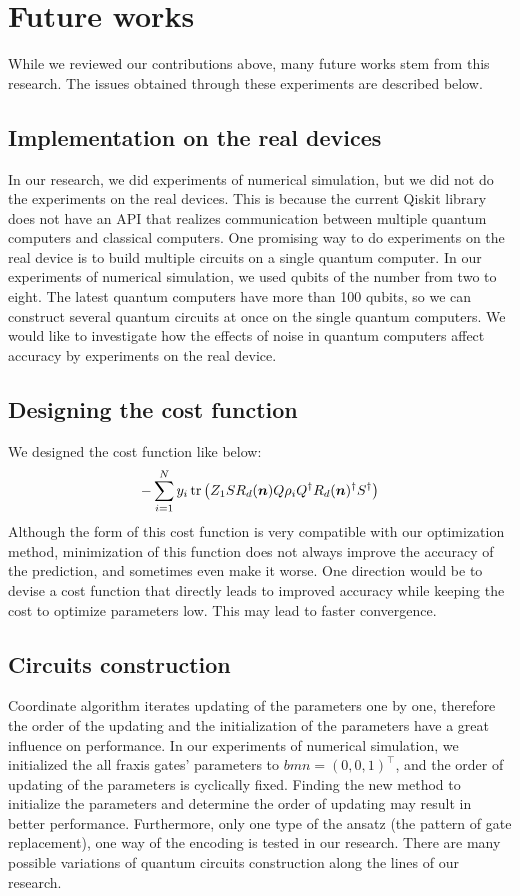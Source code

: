 \section{Future works}
While we reviewed our contributions above, many future works stem from this research. The issues obtained through these experiments are described below.

\subsection{Implementation on the real devices}
In our research, we did experiments of numerical simulation, but we did not do the experiments on the real devices. This is because the current Qiskit library does not have an API that realizes communication between multiple quantum computers and classical computers. One promising way to do experiments on the real device is to build multiple circuits on a single quantum computer. In our experiments of numerical simulation, we used qubits of the number from two to eight. The latest quantum computers have more than 100 qubits, so we can construct several quantum circuits at once on the single quantum computers. We would like to investigate how the effects of noise in quantum computers affect accuracy by experiments on the real device.

\subsection{Designing the cost function}

We designed the cost function like below:
$$-\sum_{i=1}^N y_{i}\operatorname{tr}{\left(Z_1 SR_d(\bm{n})Q\rho_{i} Q^\dagger R_d(\bm{n})^{\dagger}S^\dagger\right)}$$
Although the form of this cost function is very compatible with our optimization method, minimization of this function does not always improve the accuracy of the prediction, and sometimes even make it worse. One direction would be to devise a cost function that directly leads to improved accuracy while keeping the cost to optimize parameters low. This may lead to faster convergence.

\subsection{Circuits construction}

Coordinate algorithm iterates updating of the parameters one by one, therefore the order of the updating and the initialization of the parameters have a great influence on performance.
In our experiments of numerical simulation, we initialized the all fraxis gates' parameters to $bm{n}=(0,0,1)^\top$, and the order of updating of the parameters is cyclically fixed. Finding the new method to initialize the parameters and determine the order of updating may result in better performance. Furthermore, only one type of the ansatz (the pattern of gate replacement), one way of the encoding is tested in our research. There are many possible variations of quantum circuits construction along the lines of our research.